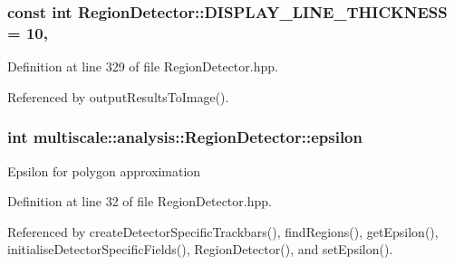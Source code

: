 \hypertarget{classmultiscale_1_1analysis_1_1RegionDetector_aee6fbc641e8a6a85b1d877f9b4c6c6c3}{
\subsubsection[{D\-I\-S\-P\-L\-A\-Y\-\_\-\-L\-I\-N\-E\-\_\-\-T\-H\-I\-C\-K\-N\-E\-S\-S}]{\setlength{\rightskip}{0pt plus 5cm}const int Region\-Detector\-::\-D\-I\-S\-P\-L\-A\-Y\-\_\-\-L\-I\-N\-E\-\_\-\-T\-H\-I\-C\-K\-N\-E\-S\-S = 10\hspace{0.3cm}{\ttfamily [static]}, {\ttfamily [private]}}}\label{classmultiscale_1_1analysis_1_1RegionDetector_aee6fbc641e8a6a85b1d877f9b4c6c6c3}


Definition at line 329 of file Region\-Detector.\-hpp.



Referenced by output\-Results\-To\-Image().

\hypertarget{classmultiscale_1_1analysis_1_1RegionDetector_acf21910fadd7c6ef2810743a78a0aeb9}{
\subsubsection[{epsilon}]{\setlength{\rightskip}{0pt plus 5cm}int multiscale\-::analysis\-::\-Region\-Detector\-::epsilon\hspace{0.3cm}{\ttfamily [private]}}}\label{classmultiscale_1_1analysis_1_1RegionDetector_acf21910fadd7c6ef2810743a78a0aeb9}
Epsilon for polygon approximation 

Definition at line 32 of file Region\-Detector.\-hpp.



Referenced by create\-Detector\-Specific\-Trackbars(), find\-Regions(), get\-Epsilon(), initialise\-Detector\-Specific\-Fields(), Region\-Detector(), and set\-Epsilon().


